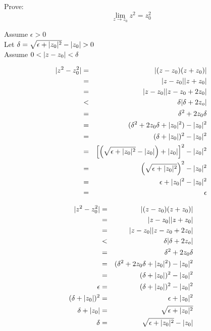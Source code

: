 \documentclass[letterpaper,12pt,fleqn]{article}
\newcommand{\e}{\epsilon}
\renewcommand{\d}{\delta}
\begin{document}
\begin{example}
  Prove:
  \[\lim_{z\to z_0}z^2=z_0^2\]

  \begin{minipage}[t]{3.5in}
    Assume $\e>0$ \\
    Let $\d=\sqrt{\e+\abs{z_0}^2}-\abs{z_0}>0$ \\
    Assume $0<\abs{z-z_0}<\d$
    
    \begin{eqnarray*}
      \abs{z^2-z_0^2} &=& \abs{(z-z_0)(z+z_0)} \\
      &=& \abs{z-z_0}\abs{z+z_0} \\
      &=& \abs{z-z_0}\abs{z-z_0+2z_0} \\
      &<& \d\abs{\d+2z_o} \\
      &=& \d^2+2z_0\d \\
      &=& (\d^2+2z_0\d+\abs{z_0}^2)-\abs{z_0}^2 \\
      &=& (\d+\abs{z_0})^2-\abs{z_0}^2 \\
      &=& \left[\left(\sqrt{\e+\abs{z_0}^2}-\abs{z_0}\right)+\abs{z_0}\right]^2-
      \abs{z_0}^2 \\
      &=& \left(\sqrt{\e+\abs{z_0}^2}\right)^2-\abs{z_0}^2 \\
      &=& \e+\abs{z_0}^2-\abs{z_0}^2 \\
      &=& \e \\
    \end{eqnarray*}
  \end{minipage}
  \begin{minipage}[t]{3in}
    \begin{eqnarray*}
      \abs{z^2-z_0^2} &=& \abs{(z-z_0)(z+z_0)} \\
      &=& \abs{z-z_0}\abs{z+z_0} \\
      &=& \abs{z-z_0}\abs{z-z_0+2z_0} \\
      &<& \d\abs{\d+2z_o} \\
      &=& \d^2+2z_0\d \\
      &=& (\d^2+2z_0\d+\abs{z_0}^2)-\abs{z_0}^2 \\
      &=& (\d+\abs{z_0})^2-\abs{z_0}^2 \\
      \e &=& (\d+\abs{z_0})^2-\abs{z_0}^2 \\
      (\d+\abs{z_0})^2 &=& \e+\abs{z_0}^2 \\
      \d+\abs{z_0} &=& \sqrt{\e+\abs{z_0}^2} \\
      \d &=& \sqrt{\e+\abs{z_0}^2}-\abs{z_0} \\
    \end{eqnarray*}
  \end{minipage}
\end{example}
\end{document}
